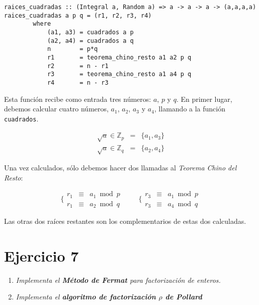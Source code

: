 \documentclass[10pt,spanish]{article}
\begin{document}
\begin{verbatim}
raices_cuadradas :: (Integral a, Random a) => a -> a -> a -> (a,a,a,a)
raices_cuadradas a p q = (r1, r2, r3, r4)
        where
            (a1, a3) = cuadrados a p
            (a2, a4) = cuadrados a q
            n        = p*q
            r1       = teorema_chino_resto a1 a2 p q
            r2       = n - r1
            r3       = teorema_chino_resto a1 a4 p q
            r4       = n - r3

\end{verbatim}

Esta función recibe como entrada tres números: $a$, $p$ y $q$. En primer lugar, debemos calcular cuatro números, $a_1$, $a_2$, $a_3$ y $a_4$, llamando a la función \texttt{cuadrados}.

\begin{displaymath}
\begin{matrix}
    \sqrt{a} \in \mathbb{Z}_p & = & \{a_1, a_3 \} \\
    \sqrt{a} \in \mathbb{Z}_q & = & \{a_2, a_4 \}
\end{matrix}
\end{displaymath}

Una vez calculados, sólo debemos hacer dos llamadas al \textit{\textcolor{rojo}{Teorema Chino del Resto}}:

\begin{displaymath}
\Bigg\{ \begin{matrix}
r_1 & \equiv & a_1 \bmod p \\
r_1 & \equiv & a_2 \bmod q 
\end{matrix}
\qquad\
\Bigg\{ 
\begin{matrix}
r_3 & \equiv & a_1 \bmod p \\
r_3 & \equiv & a_4 \bmod q 
\end{matrix}
\end{displaymath}

Las otras dos raíces restantes son los complementarios de estas dos calculadas.

\section{\textcolor{rojo}Ejercicio 7}
\begin{enumerate}[\color{rojo}{$\bullet$}]
    \item \textit{Implementa el \textbf{\textcolor{rojo}{Método de Fermat}} para factorización de enteros.}
    \item \textit{Implementa el \textbf{\textcolor{rojo}{algoritmo de factorización $\rho$ de Pollard}}}
\end{enumerate}
\end{document}
